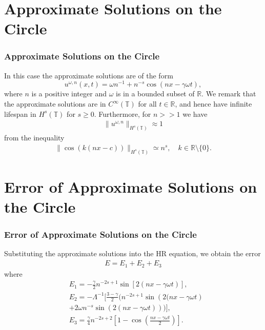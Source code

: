 \documentclass{beamer}
\newcommand{\rr}{\mathbb{R}}
\newcommand{\ci}{\mathbb{T}}
\begin{document}
\section{Approximate Solutions on the Circle}
\begin{frame}
	\frametitle{Approximate Solutions on the Circle}
%
%
%
In this case the  approximate solutions are of the form
%
%
\begin{equation*}
\label{approx-solutions-form}
u^{\omega,n}(x,t) = \omega n^{-1} + n^{-s} \cos \left( nx - \gamma \omega t
\right), 
\end{equation*}
where $n$ is a positive integer and $\omega$ is in a bounded subset of 
$\rr$. We remark that the approximate 
solutions are in $C^\infty(\ci)$ for all $t \in \rr$, and hence have 
infinite lifespan in $H^s(\ci)$ for $s  \ge 0$. 
\pause
Furthermore, for $n>>1$ we 
have 
%
%
\begin{equation*}
	\label{bound-approx}
	\begin{split}
		\|u^{\omega,n} \|_{H^s(\ci)} \approx 1	
	\end{split}
\end{equation*}
%
%
from the inequality
\begin{equation*}
\label{1m}
\begin{split}
	\|\cos(k(nx-c))\|_{H^s(\ci)} \simeq n^s, \quad k \in \rr \setminus
	\{0\}.
\end{split}
\end{equation*}


\end{frame}

\section{Error of Approximate Solutions on the Circle}
\begin{frame}
	\frametitle{Error of Approximate Solutions on the Circle}
Substituting the approximate solutions into the HR equation, we obtain the error
%
%
\begin{equation*}
\begin{split}
E=
E_1 + E_2 + E_3 \label{57}
\end{split}
\end{equation*}
%
%
where
\begin{align*}
& E_1 =
- \frac{\gamma}{2}n^{-2s+1}\sin\left[ 2\left( nx - \gamma \omega t \right)
\right],
\\
& E_2 = - \Lambda^{-1} \bigg[ \frac{3-\gamma}{2} \bigg (
n^{-2s+1} \sin\left( 2(nx - \gamma \omega t \right)
\\
& + 2\omega n^{-s} \sin( 
2(nx - \gamma \omega t))
\bigg )
\bigg ],
\\
& E_3 = \frac{\gamma}{4}
n^{-2s+2} \left [ 1- \cos \left (\frac{nx - \gamma \omega t}{2} \right) 
\right ].
\label{90}
\end{align*}

\end{frame}
%
%
%
%
%
%
%
%                      
%
%
%
%
\end{document}
